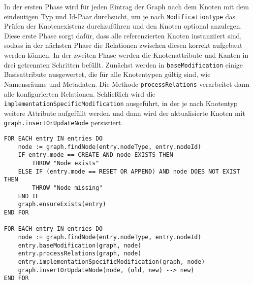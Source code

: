 In der ersten Phase wird für jeden Eintrag der Graph nach dem Knoten mit dem eindeutigen Typ und Id-Paar durchsucht, um je nach \texttt{ModificationType} das Prüfen der Knotenexistenz durchzuführen und den Knoten optional anzulegen.
Diese erste Phase sorgt dafür, dass alle referenzierten Knoten instanziiert sind, sodass in der nächsten Phase die Relationen zwischen diesen korrekt aufgebaut werden können.
In der zweiten Phase werden die Knotenattribute und Kanten in drei getrennten Schritten befüllt.
Zunächst werden in \texttt{baseModification} einige Basisattribute ausgewertet, die für alle Knotentypen gültig sind, wie Namensräume und Metadaten.
Die Methode \texttt{processRelations} verarbeitet dann alle konfigurierten Relationen.
Schließlich wird die \texttt{implementationSpecificModification} ausgeführt, in der je nach Knotentyp weitere Attribute aufgefüllt werden und dann wird der aktualisierte Knoten mit \texttt{graph.insertOrUpdateNode} persistiert.

\begin{lstlisting}[language=pseudo,caption={Ablauf des Modifikationssystems für eine Menge an Modifikationen},label=lst:modifikation-pseudocode,basicstyle=\ttfamily\scriptsize]
FOR EACH entry IN entries DO
    node := graph.findNode(entry.nodeType, entry.nodeId)
    IF entry.mode == CREATE AND node EXISTS THEN
        THROW "Node exists"
    ELSE IF (entry.mode == RESET OR APPEND) AND node DOES NOT EXIST THEN
        THROW "Node missing"
    END IF
    graph.ensureExists(entry)
END FOR

FOR EACH entry IN entries DO
    node := graph.findNode(entry.nodeType, entry.nodeId)
    entry.baseModification(graph, node)
    entry.processRelations(graph, node)
    entry.implementationSpecificModification(graph, node)
    graph.insertOrUpdateNode(node, (old, new) --> new)
END FOR
\end{lstlisting}
